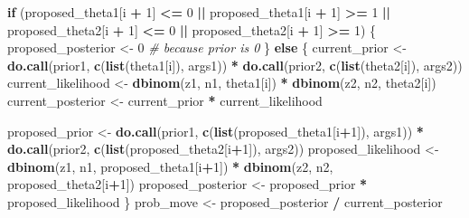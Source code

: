 \documentclass[
  12pt,
]{book}
\newenvironment{Shaded}{\begin{snugshade}}{\end{snugshade}}
\newcommand{\CommentTok}[1]{\textcolor[rgb]{0.56,0.35,0.01}{\textit{#1}}}
\newcommand{\ControlFlowTok}[1]{\textcolor[rgb]{0.13,0.29,0.53}{\textbf{#1}}}
\newcommand{\DecValTok}[1]{\textcolor[rgb]{0.00,0.00,0.81}{#1}}
\newcommand{\KeywordTok}[1]{\textcolor[rgb]{0.13,0.29,0.53}{\textbf{#1}}}
\newcommand{\NormalTok}[1]{#1}
\newcommand{\OperatorTok}[1]{\textcolor[rgb]{0.81,0.36,0.00}{\textbf{#1}}}
\newcommand{\StringTok}[1]{\textcolor[rgb]{0.31,0.60,0.02}{#1}}
\theoremstyle{definition}
\theoremstyle{definition}
\theoremstyle{definition}
\theoremstyle{remark}
\begin{document}
\begin{Shaded}
\begin{Highlighting}[]
    \ControlFlowTok{if}\NormalTok{ (proposed_theta1[i }\OperatorTok{+}\StringTok{ }\DecValTok{1}\NormalTok{] }\OperatorTok{<=}\StringTok{ }\DecValTok{0} \OperatorTok{||}
\StringTok{        }\NormalTok{proposed_theta1[i }\OperatorTok{+}\StringTok{ }\DecValTok{1}\NormalTok{] }\OperatorTok{>=}\StringTok{ }\DecValTok{1} \OperatorTok{||}
\StringTok{        }\NormalTok{proposed_theta2[i }\OperatorTok{+}\StringTok{ }\DecValTok{1}\NormalTok{] }\OperatorTok{<=}\StringTok{ }\DecValTok{0} \OperatorTok{||}
\StringTok{        }\NormalTok{proposed_theta2[i }\OperatorTok{+}\StringTok{ }\DecValTok{1}\NormalTok{] }\OperatorTok{>=}\StringTok{ }\DecValTok{1}\NormalTok{) \{}
\NormalTok{      proposed_posterior <-}\StringTok{ }\DecValTok{0}  \CommentTok{# because prior is 0}
\NormalTok{    \} }\ControlFlowTok{else}\NormalTok{ \{}
\NormalTok{      current_prior <-}\StringTok{ }
\StringTok{        }\KeywordTok{do.call}\NormalTok{(prior1, }\KeywordTok{c}\NormalTok{(}\KeywordTok{list}\NormalTok{(theta1[i]), args1)) }\OperatorTok{*}
\StringTok{        }\KeywordTok{do.call}\NormalTok{(prior2, }\KeywordTok{c}\NormalTok{(}\KeywordTok{list}\NormalTok{(theta2[i]), args2))}
\NormalTok{      current_likelihood  <-}\StringTok{ }
\StringTok{        }\KeywordTok{dbinom}\NormalTok{(z1, n1, theta1[i]) }\OperatorTok{*}
\StringTok{        }\KeywordTok{dbinom}\NormalTok{(z2, n2, theta2[i])}
\NormalTok{      current_posterior   <-}\StringTok{ }\NormalTok{current_prior }\OperatorTok{*}\StringTok{ }\NormalTok{current_likelihood}
      
\NormalTok{      proposed_prior <-}\StringTok{ }
\StringTok{        }\KeywordTok{do.call}\NormalTok{(prior1, }\KeywordTok{c}\NormalTok{(}\KeywordTok{list}\NormalTok{(proposed_theta1[i}\OperatorTok{+}\DecValTok{1}\NormalTok{]), args1)) }\OperatorTok{*}
\StringTok{        }\KeywordTok{do.call}\NormalTok{(prior2, }\KeywordTok{c}\NormalTok{(}\KeywordTok{list}\NormalTok{(proposed_theta2[i}\OperatorTok{+}\DecValTok{1}\NormalTok{]), args2))}
\NormalTok{      proposed_likelihood  <-}\StringTok{ }
\StringTok{        }\KeywordTok{dbinom}\NormalTok{(z1, n1, proposed_theta1[i}\OperatorTok{+}\DecValTok{1}\NormalTok{]) }\OperatorTok{*}
\StringTok{        }\KeywordTok{dbinom}\NormalTok{(z2, n2, proposed_theta2[i}\OperatorTok{+}\DecValTok{1}\NormalTok{])}
\NormalTok{      proposed_posterior   <-}\StringTok{ }\NormalTok{proposed_prior }\OperatorTok{*}\StringTok{ }\NormalTok{proposed_likelihood}
\NormalTok{    \}}
\NormalTok{    prob_move           <-}\StringTok{ }\NormalTok{proposed_posterior }\OperatorTok{/}\StringTok{ }\NormalTok{current_posterior}
    

\end{Highlighting}
\end{Shaded}
\end{document}
